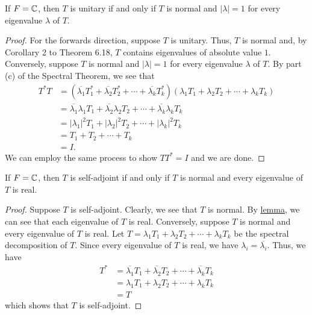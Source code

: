 \begin{corollary}
    If \( F = \mathbb{C}  \), then \( T  \) is unitary if and only if \( T  \) is normal and \( | \lambda |  = 1  \) for every eigenvalue \( \lambda \) of \( T  \).
\end{corollary}
\begin{proof}
For the forwards direction, suppose \( T  \) is unitary. Thus, \( T  \) is normal and, by Corollary 2 to Theorem 6.18, \( T  \) contains eigenvalues of absolute value \( 1 \). Conversely, suppose \( T  \) is normal and \( | \lambda |  = 1  \) for every eigenvalue \( \lambda  \) of \( T  \). By part (c) of the Spectral Theorem, we see that 
\begin{align*}
    T^{*}T &= (\overline{{\lambda}_{1}} {T}_{1}^{*} + \overline{{\lambda}_{2}} {T}_{2}^{*} + \cdots + \overline{{\lambda}_{k}} {T}_{k}^{*}) ({\lambda}_{1} {T}_{1} + {\lambda}_{2} {T}_{2} + \cdots + {\lambda}_{k} {T}_{k})  \\
           &= \overline{{\lambda}_{1}} {\lambda}_{1} {T}_{1} + \overline{{\lambda}_{2}} {\lambda}_{2} {T}_{2} + \cdots + \overline{{\lambda}_{k}} {\lambda}_{k} {T}_{k} \\   
           &= | {\lambda}_{1} |^{2} {T}_{1} + | {\lambda}_{2} |^{2} {T}_{2} + \cdots + | {\lambda}_{k} |^{2} {T}_{k} \\
           &= {T}_{1} + {T}_{2} + \cdots + {T}_{k} \\
           &= I.
\end{align*}
We can employ the same process to show \( TT^{*} = I  \) and we are done.
\end{proof} 

\begin{corollary}
    If \( F = \mathbb{C}  \), then \( T  \) is self-adjoint if and only if \( T  \) is normal and every eigenvalue of \( T  \) is real.
\end{corollary}
\begin{proof}
    Suppose \( T  \) is self-adjoint. Clearly, we see that \( T  \) is normal. By {\hyperref[Lemma Prior to Theorem 6.17]{lemma}},  we can see that each eigenvalue of \( T  \) is real. Conversely, suppose \( T  \) is normal and every eigenvalue of \( T  \) is real. Let \( T  = {\lambda}_{1} {T}_{1} + {\lambda}_{2} {T}_{2} + \cdots + {\lambda}_{k} {T}_{k} \) be the spectral decomposition of \( T  \). Since every eigenvalue of \( T  \) is real, we have \( {\lambda}_{i} = \overline{{\lambda}_{i}} \). Thus, we have
\begin{align*}
T^{*} &= \overline{{\lambda}_{1}} {T}_{1} + \overline{{\lambda}_{2}} {T}_{2} + \cdots + \overline{{\lambda}_{k}} {T}_{k} \\   
      &= {\lambda}_{1} {T}_{1} + {\lambda}_{2} {T}_{2} + \cdots + {\lambda}_{k} {T}_{k} \\
      &= T
\end{align*} 
which shows that \( T  \) is self-adjoint.
\end{proof}

